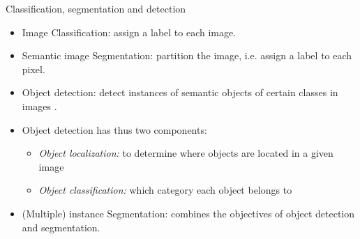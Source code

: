 \documentclass[xcolor=pdftex,dvipsnames,table]{beamer}
\begin{document}
\begin{frame}{Classification, segmentation and detection}
\begin{itemize}
	\item Image Classification: assign a label to each image. 
	\item Semantic image Segmentation: partition the image, i.e. assign a label to each pixel.   
	\item Object detection: detect instances of semantic objects of certain classes in images \cite{Ren2017, Zhao2019}.
	\item Object detection has thus two components:
	\begin{itemize}
		\item \textit{Object localization:} to determine where objects are located in a given image
		\item \textit{Object classification:} which category each object belongs to
	\end{itemize}
   \item (Multiple) instance Segmentation: combines the objectives of object detection and segmentation.
\end{itemize}
\end{frame}
\end{document}
